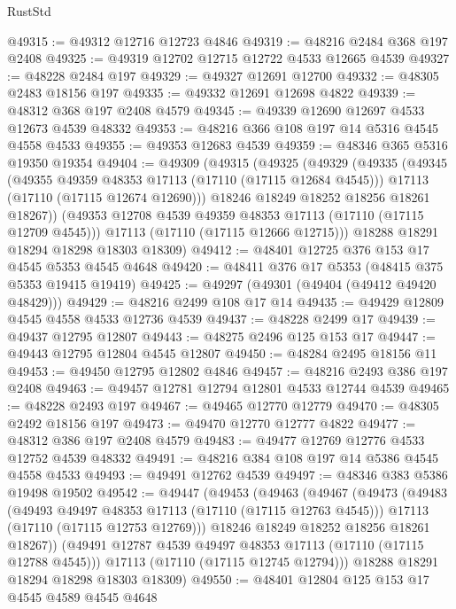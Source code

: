 \begin{lexlean}{RustStd}
\begin{coremodule}
@49315 := @49312 @12716 @12723 @4846
@49319 := @48216 @2484 @368 @197 @2408
@49325 := @49319 @12702 @12715 @12722 @4533 @12665 @4539
@49327 := @48228 @2484 @197
@49329 := @49327 @12691 @12700
@49332 := @48305 @2483 @18156 @197
@49335 := @49332 @12691 @12698 @4822
@49339 := @48312 @368 @197 @2408 @4579
@49345 := @49339 @12690 @12697 @4533 @12673 @4539 @48332
@49353 := @48216 @366 @108 @197 @14 @5316 @4545 @4558 @4533
@49355 := @49353 @12683 @4539
@49359 := @48346 @365 @5316 @19350 @19354
@49404 := @49309
    (@49315
      (@49325
        (@49329
          (@49335
            (@49345
              (@49355 @49359 @48353 @17113 (@17110 (@17115 @12684 @4545)))
              @17113
              (@17110 (@17115 @12674 @12690)))
            @18246
            @18249
            @18252
            @18256
            @18261
            @18267))
        (@49353 @12708 @4539 @49359 @48353 @17113 (@17110 (@17115 @12709 @4545)))
        @17113
        (@17110 (@17115 @12666 @12715)))
      @18288
      @18291
      @18294
      @18298
      @18303
      @18309)
@49412 := @48401 @12725 @376 @153 @17 @4545 @5353 @4545 @4648
@49420 := @48411 @376 @17 @5353 (@48415 @375 @5353 @19415 @19419)
@49425 := @49297 (@49301 (@49404 (@49412 @49420 @48429)))
@49429 := @48216 @2499 @108 @17 @14
@49435 := @49429 @12809 @4545 @4558 @4533 @12736 @4539
@49437 := @48228 @2499 @17
@49439 := @49437 @12795 @12807
@49443 := @48275 @2496 @125 @153 @17
@49447 := @49443 @12795 @12804 @4545 @12807
@49450 := @48284 @2495 @18156 @11
@49453 := @49450 @12795 @12802 @4846
@49457 := @48216 @2493 @386 @197 @2408
@49463 := @49457 @12781 @12794 @12801 @4533 @12744 @4539
@49465 := @48228 @2493 @197
@49467 := @49465 @12770 @12779
@49470 := @48305 @2492 @18156 @197
@49473 := @49470 @12770 @12777 @4822
@49477 := @48312 @386 @197 @2408 @4579
@49483 := @49477 @12769 @12776 @4533 @12752 @4539 @48332
@49491 := @48216 @384 @108 @197 @14 @5386 @4545 @4558 @4533
@49493 := @49491 @12762 @4539
@49497 := @48346 @383 @5386 @19498 @19502
@49542 := @49447
    (@49453
      (@49463
        (@49467
          (@49473
            (@49483
              (@49493 @49497 @48353 @17113 (@17110 (@17115 @12763 @4545)))
              @17113
              (@17110 (@17115 @12753 @12769)))
            @18246
            @18249
            @18252
            @18256
            @18261
            @18267))
        (@49491 @12787 @4539 @49497 @48353 @17113 (@17110 (@17115 @12788 @4545)))
        @17113
        (@17110 (@17115 @12745 @12794)))
      @18288
      @18291
      @18294
      @18298
      @18303
      @18309)
@49550 := @48401 @12804 @125 @153 @17 @4545 @4589 @4545 @4648

\end{coremodule}
\end{lexlean}
